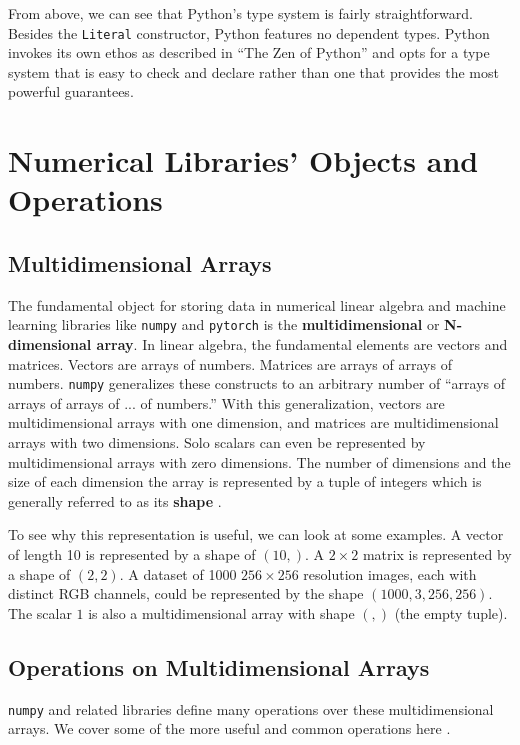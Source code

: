 \documentclass[12pt]{report}
\begin{document}
From above, we can see that Python's type system is fairly straightforward. Besides the \texttt{Literal} constructor, Python features no dependent types. Python invokes its own ethos as described in ``The Zen of Python'' and opts for a type system that is easy to check and declare rather than one that provides the most powerful guarantees.

\section{Numerical Libraries' Objects and Operations}

\subsection{Multidimensional Arrays}
\label{multidimensional}

The fundamental object for storing data in numerical linear algebra and machine learning libraries like \texttt{numpy} and \texttt{pytorch} is the \textbf{multidimensional} or \textbf{N-dimensional array}. In linear algebra, the fundamental elements are vectors and matrices. Vectors are arrays of numbers. Matrices are arrays of arrays of numbers. \texttt{numpy} generalizes these constructs to an arbitrary number of ``arrays of arrays of arrays of ... of numbers.'' With this generalization, vectors are multidimensional arrays with one dimension, and matrices are multidimensional arrays with two dimensions. Solo scalars can even be represented by multidimensional arrays with zero dimensions. The number of dimensions and the size of each dimension the array is represented by a tuple of integers which is generally referred to as its \textbf{shape} \cite{ndarray}.

To see why this representation is useful, we can look at some examples. A vector of length 10 is represented by a shape of $(10,)$. A $2 \times 2$ matrix is represented by a shape of $(2, 2)$. A dataset of 1000 $256 \times 256$ resolution images, each with distinct RGB channels, could be represented by the shape $(1000, 3, 256, 256)$. The scalar $1$ is also a multidimensional array with shape $(,)$ (the empty tuple).

\subsection{Operations on Multidimensional Arrays}
\label{ndarray-operations}

\texttt{numpy} and related libraries define many operations over these multidimensional arrays. We cover some of the more useful and common operations here \cite{numpy-manual}.
\end{document}

